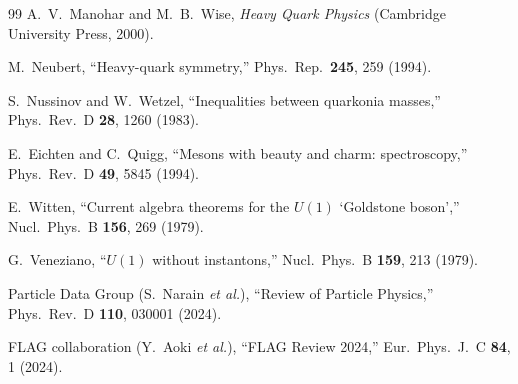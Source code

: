 \documentclass[11pt,a4paper]{article}
\theoremstyle{plain}
\begin{document}
\begin{thebibliography}{99}
  A.~V.~Manohar and M.~B.~Wise,
  \textit{Heavy Quark Physics}
  (Cambridge University Press, 2000).

  M.~Neubert,
  ``Heavy-quark symmetry,''
  Phys.\ Rep.\ \textbf{245}, 259 (1994).

  S.~Nussinov and W.~Wetzel,
  ``Inequalities between quarkonia masses,''
  Phys.\ Rev.\ D \textbf{28}, 1260 (1983).

  E.~Eichten and C.~Quigg,
  ``Mesons with beauty and charm: spectroscopy,''
  Phys.\ Rev.\ D \textbf{49}, 5845 (1994).

  E.~Witten,
  ``Current algebra theorems for the $U(1)$ `Goldstone boson',''
  Nucl.\ Phys.\ B \textbf{156}, 269 (1979).

  G.~Veneziano,
  ``$U(1)$ without instantons,''
  Nucl.\ Phys.\ B \textbf{159}, 213 (1979).

  Particle Data Group (S.~Narain \textit{et al.}),
  ``Review of Particle Physics,''
  Phys.\ Rev.\ D \textbf{110}, 030001 (2024).

  FLAG collaboration (Y.~Aoki \textit{et al.}),
  ``FLAG Review 2024,''
  Eur.\ Phys.\ J.\ C \textbf{84}, 1 (2024).

\end{thebibliography}
\end{document}
